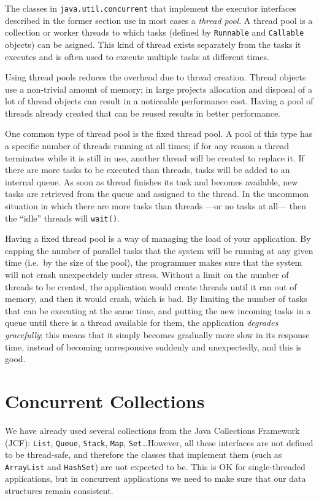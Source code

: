 The classes in \verb+java.util.concurrent+ that implement the executor
interfaces described in the former section use in most cases a
\emph{thread pool}. A thread pool is a collection or worker threads
to which tasks (defined by \verb+Runnable+ and \verb+Callable+
objects) can be asigned. This kind of thread exists separately from
the tasks it executes and is often used to execute multiple tasks at
different times. 

Using thread pools reduces the overhead due to thread creation. Thread
objects use a non-trivial amount of memory; in large projects
allocation and disposal of a lot of thread objects can result in a
noticeable performance cost. Having a pool of threads already created
that can be reused results in better performance. 

One common type of thread pool is the fixed thread pool. A pool of
this type has a specific number of threads running at all times; if
for any reason a thread terminates while it is still in use, another
thread will be created to replace it. If there are more tasks to be
executed than threads, tasks will be added to an internal queue. As
soon as thread finishes its task and becomes available, new tasks are
retrieved from the queue and assigned to the thread. In the uncommon
situation in which there are more tasks than threads ---or no tasks at
all--- then the ``idle'' threads will \verb+wait()+.

Having a fixed thread pool is a way of managing the load of your
application. By capping the number of parallel tasks that the system
will be running at any given time (i.e.~by the size of the pool), 
the programmer makes sure that the
system will not crash unexpectdely under stress. Without a limit on
the number of threads to be created, the application would 
create threads until it ran out of memory, and then it would crash,
which is bad. By limiting the number of tasks that can be executing at
the same time, and putting the new incoming tasks in a queue until
there is a thread available for them, the application \emph{degrades
  gracefully}; this means that it simply becomes gradually more slow
in its response time, instead of becoming unresponsive suddenly and
unexpectedly, and this is good.

\section{Concurrent Collections}
\label{sec:conc-coll}

We have already used several collections from the Java Collections
Framework (JCF): \verb+List+, \verb+Queue+, \verb+Stack+, \verb+Map+,
\verb+Set+\ldots However, all these interfaces are not defined to be
thread-safe, and therefore the classes that implement them (such as
\verb+ArrayList+ and \verb+HashSet+) are not expected to be. This is OK
for single-threaded applications, but in concurrent applications we
need to make sure that our data structures remain consistent. 

